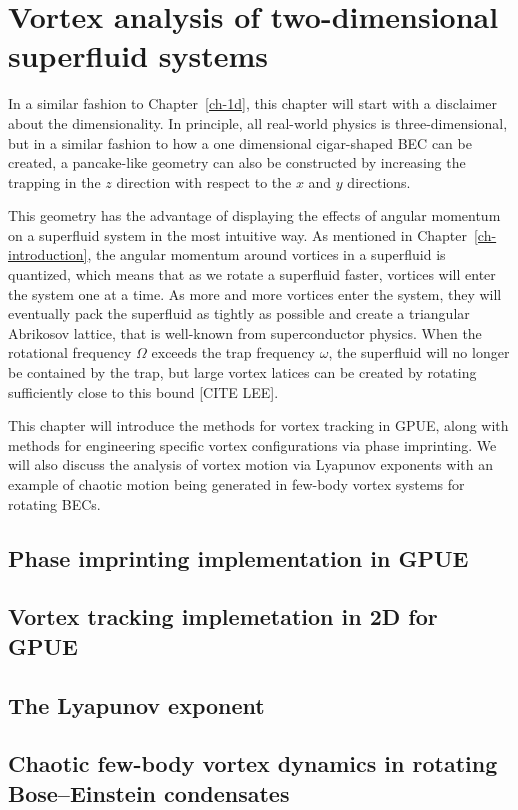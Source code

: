\chapter{Vortex analysis of two-dimensional superfluid systems}
\label{ch-2d}

In a similar fashion to Chapter~\ref{ch-1d}, this chapter will start with a disclaimer about the dimensionality.
In principle, all real-world physics is three-dimensional, but in a similar fashion to how a one dimensional cigar-shaped BEC can be created, a pancake-like geometry can also be constructed by increasing the trapping in the $z$ direction with respect to the $x$ and $y$ directions.

This geometry has the advantage of displaying the effects of angular momentum on a superfluid system in the most intuitive way.
As mentioned in Chapter~\ref{ch-introduction}, the angular momentum around vortices in a superfluid is quantized, which means that as we rotate a superfluid faster, vortices will enter the system one at a time.
As more and more vortices enter the system, they will eventually pack the superfluid as tightly as possible and create a triangular Abrikosov lattice, that is well-known from superconductor physics.
When the rotational frequency $\Omega$ exceeds the trap frequency $\omega$, the superfluid will no longer be contained by the trap, but large vortex latices can be created by rotating sufficiently close to this bound [CITE LEE].

This chapter will introduce the methods for vortex tracking in GPUE, along with methods for engineering specific vortex configurations via phase imprinting.
We will also discuss the analysis of vortex motion via Lyapunov exponents with an example of chaotic motion being generated in few-body vortex systems for rotating BECs.


\section{Phase imprinting implementation in GPUE}
\section{Vortex tracking implemetation in 2D for GPUE}
\section{The Lyapunov exponent}

\section{Chaotic few-body vortex dynamics in rotating Bose--Einstein condensates}
